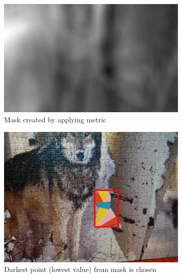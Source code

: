 \begin{figure}
\begin{subfigure}[t]{0.48\linewidth}
    \includegraphics[width=\linewidth]{img/pattern_matching/mask.jpg}
    \vspace{4mm}%
    \caption{Mask created by applying metric}
  \end{subfigure}
  \begin{subfigure}[t]{0.48\linewidth}
    \includegraphics[width=\linewidth]{img/pattern_matching/result-correct.jpg}
    \caption{Darkest point (lowest value) from mask is chosen}
  \end{subfigure}\\
  \begin{subfigure}[t]{0.48\linewidth}
    \vspace{-52mm}%

\end{subfigure}
\end{figure}
